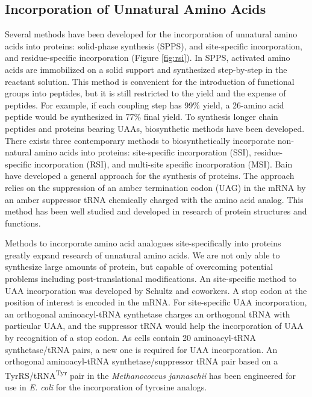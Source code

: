\begin{refsection}
\subsection{Incorporation of Unnatural Amino Acids} \label{sec:rsi-intro}

Several methods have been developed for the incorporation of unnatural amino
acids into proteins: solid-phase synthesis (SPPS)\cite{Mahto2011},  and
 site-specific incorporation,\cite{Cellitti2008,Hassan2008} and
residue-specific incorporation (Figure \ref{fig:rsi}).\cite{Johnson2010} In
SPPS, activated amino acids are immobilized on a solid support and synthesized
step-by-step in the reactant solution. This method is convenient for the
introduction of functional groups into peptides, but it is still restricted to
the yield and the expense of peptides. For example, if each coupling step has
99\% yield, a 26-amino acid peptide would be synthesized in 77\% final yield.
To synthesis longer chain peptides and proteins bearing UAAs, biosynthetic
methods have been developed.  There exists three contemporary methods to
biosynthetically incorporate non-natural amino acids into proteins:
site-specific incorporation (SSI), residue-specific incorporation (RSI), and
multi-site specific incorporation (MSI). Bain  have developed a
general approach for the  synthesis of proteins\cite{Bain1991}.
The approach relies on the suppression of an amber termination codon (UAG) in
the mRNA by an amber suppressor tRNA chemically charged with the amino acid
analog. This method has been well studied and developed in research of protein
structures and functions\cite{Martoglio1995,Eichler1997}.

Methods to incorporate amino acid analogues site-specifically into proteins
 greatly expand research of unnatural amino acids. We are not
only able to synthesize large amounts of protein, but capable of overcoming
potential problems including post-translational modifications. An  site-specific method to UAA incorporation was developed by Schultz and
coworkers\cite{Wang2001,Wang2002}. A stop codon at the position of interest is
encoded in the mRNA. For  site-specific UAA incorporation, an
orthogonal aminoacyl-tRNA synthetase charges an orthogonal tRNA with particular
UAA, and the suppressor tRNA would help the incorporation of UAA by recognition
of a stop codon. As cells contain 20 aminoacyl-tRNA synthetase/tRNA pairs, a
new one is required for UAA incorporation. An orthogonal aminoacyl-tRNA
synthetase/suppressor tRNA pair based on a TyrRS/tRNA\textsuperscript{Tyr} pair
in the \emph{Methanococcus jannaschii} has been engineered for use in \emph{E.
coli} for the incorporation of tyrosine analogs\cite{Wang2001}.


\end{refsection}
